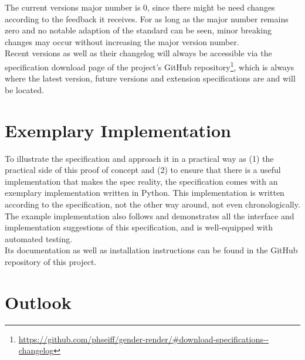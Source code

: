 \documentclass{article}
\begin{document}
    The current versions major number is 0, since there might be need changes according to the feedback it receives.
    For as long as the major number remains zero and no notable adaption of the standard can be seen, minor breaking changes may occur without increasing the major version number.\\

    Recent versions as well as their changelog will always be accessible via the specification download page of the project's GitHub repository\footnote{\url{https://github.com/phseiff/gender-render/\#download-specifications--changelog}}, which is always where the latest version, future versions and extension specifications are and will be located.\\

\section{Exemplary Implementation}

    To illustrate the specification and approach it in a practical way as (1) the practical side of this proof of concept and (2) to ensure that there is a useful implementation that makes the spec reality, the specification comes with an exemplary implementation written in Python.
    This implementation is written according to the specification, not the other way around, not even chronologically.
    The example implementation also follows and demonstrates all the interface and implementation suggestions of this specification, and is well-equipped with automated testing.\\

    Its documentation as well as installation instructions can be found in the GitHub repository of this project.\\

\section{Outlook}
\end{document}
